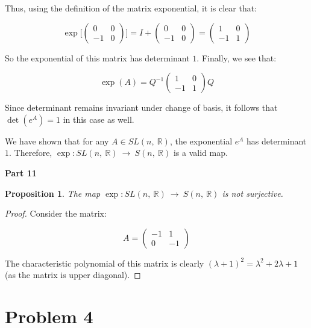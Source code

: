 \documentclass[10pt, oneside]{article}
\newtheorem{prop}{Proposition}
\begin{document}
    Thus, using the definition of the matrix exponential, it is clear that:

    $$\exp \Big[ \begin{pmatrix} 0 & 0 \\ -1 & 0 \end{pmatrix} \Big] = I + \begin{pmatrix} 0 & 0 \\ -1 & 0 \end{pmatrix} = \begin{pmatrix} 1 & 0 \\ -1 & 1 \end{pmatrix}$$

    So the exponential of this matrix has determinant $1$. Finally, we see that:

    $$\exp(A) = Q^{-1} \begin{pmatrix} 1 & 0 \\ -1 & 1 \end{pmatrix} Q$$

    Since determinant remains invariant under change of basis, it follows that $\det(e^A) = 1$ in this case as well.
    \newline

    We have shown that for any $A \in SL(n, \ \mathbb{R})$, the exponential $e^A$ has determinant $1$. Therefore, $\exp : SL(n, \ \mathbb{R}) \ \rightarrow \ S(n, \ \mathbb{R})$ is a valid
    map.
    \newline

    \textbf{Part 11}
    \newline

    \begin{prop}
      The map $\exp : SL(n, \ \mathbb{R}) \ \rightarrow \ S(n, \ \mathbb{R})$ is not surjective.
    \end{prop}

    \begin{proof}
      Consider the matrix:

      $$A = \begin{pmatrix} -1 & 1 \\ 0 & -1 \end{pmatrix}$$

      The characteristic polynomial of this matrix is clearly $(\lambda + 1)^2 = \lambda^2 + 2\lambda + 1$ (as the matrix is upper diagonal). 
      \end{proof}

    \section{Problem 4}
\end{document}
